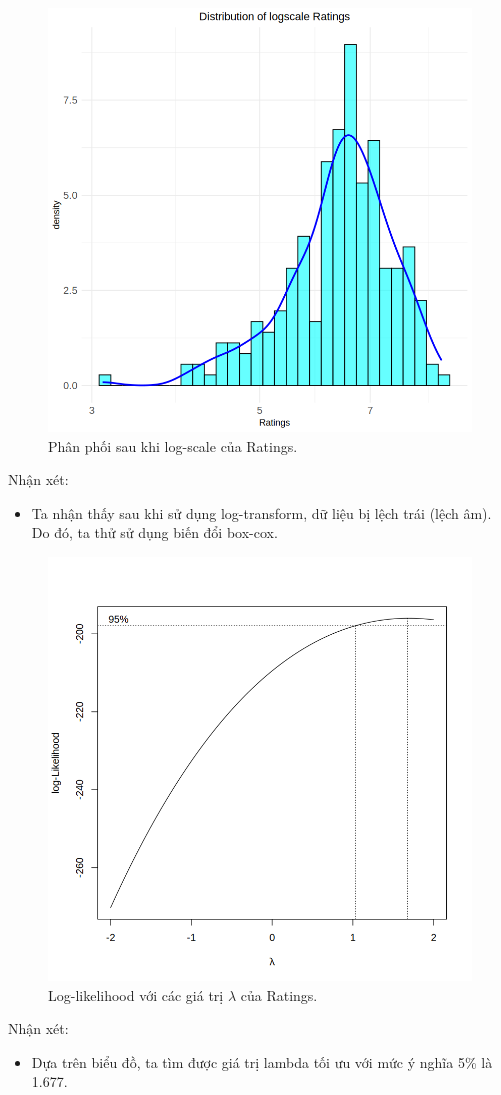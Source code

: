 \begin{figure}[H]
    \centering
    \includegraphics[width=0.75\columnwidth]{csm_figures/ratings_logscale_distribution.png}
    \caption{Phân phối sau khi log-scale của Ratings.}
    \label{fig:ratings_logscale_distribution}
\end{figure}
Nhận xét:
\begin{itemize}
    \item Ta nhận thấy sau khi sử dụng log-transform, dữ liệu bị lệch trái (lệch âm). Do đó, ta thử sử dụng biến đổi box-cox.
\end{itemize}

\begin{figure}[H]
    \centering
    \includegraphics[width=0.75\columnwidth]{csm_figures/ratings_optimal_lambda.png}
    \caption{Log-likelihood với các giá trị $\lambda$ của Ratings.}
    \label{fig:ratings_optimal_lambda}
\end{figure}
Nhận xét:
\begin{itemize}
    \item Dựa trên biểu đồ, ta tìm được giá trị lambda tối ưu với mức ý nghĩa 5\% là 1.677.
\end{itemize}

